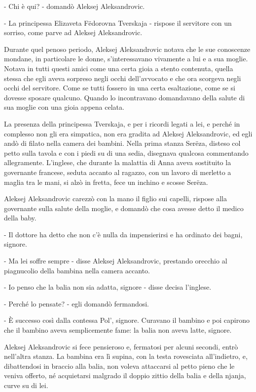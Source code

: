 - Chi è qui? - domandò Aleksej Aleksandrovic. 

- La principessa Elizaveta Fëdorovna Tverskaja - rispose il servitore con un sorriso, come parve ad Aleksej Aleksandrovic. 

Durante quel penoso periodo, Aleksej Aleksandrovic notava che le sue conoscenze mondane, in particolare le donne, s'interessavano vivamente a lui e a sua moglie. Notava in tutti questi amici come una certa gioia a stento contenuta, quella stessa che egli aveva sorpreso negli occhi dell'avvocato e che ora scorgeva negli occhi del servitore. Come se tutti fossero in una certa esaltazione, come se si dovesse sposare qualcuno. Quando lo incontravano domandavano della salute di sua moglie con una gioia appena celata. 

La presenza della principessa Tverskaja, e per i ricordi legati a lei, e perché in complesso non gli era simpatica, non era gradita ad Aleksej Aleksandrovic, ed egli andò di filato nella camera dei bambini. Nella prima stanza Serëza, disteso col petto sulla tavola e con i piedi su di una sedia, disegnava qualcosa commentando allegramente. L'inglese, che durante la malattia di Anna aveva sostituito la governante francese, seduta accanto al ragazzo, con un lavoro di merletto a maglia tra le mani, si alzò in fretta, fece un inchino e scosse Serëza. 

Aleksej Aleksandrovic carezzò con la mano il figlio sui capelli, rispose alla governante sulla salute della moglie, e domandò che cosa avesse detto il medico della baby. 

- Il dottore ha detto che non c'è nulla da impensierirsi e ha ordinato dei bagni, signore. 

- Ma lei soffre sempre - disse Aleksej Aleksandrovic, prestando orecchio al piagnucolio della bambina nella camera accanto. 

- Io penso che la balia non sia adatta, signore - disse decisa l'inglese. 

- Perché lo pensate? - egli domandò fermandosi. 

- È successo così dalla contessa Pol', signore. Curavano il bambino e poi capirono che il bambino aveva semplicemente fame: la balia non aveva latte, signore. 

Aleksej Aleksandrovic si fece pensieroso e, fermatosi per alcuni secondi, entrò nell'altra stanza. La bambina era lì supina, con la testa rovesciata all'indietro, e, dibattendosi in braccio alla balia, non voleva attaccarsi al petto pieno che le veniva offerto, né acquietarsi malgrado il doppio zittio della balia e della njanja, curve su di lei. 

